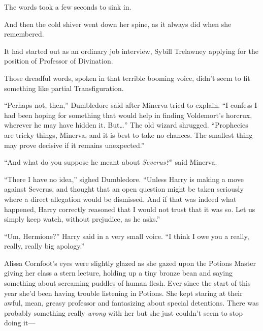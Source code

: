 The words took a few seconds to sink in.

And then the cold shiver went down her spine, as it always did when she remembered.

It had started out as an ordinary job interview, Sybill Trelawney applying for the position of Professor of Divination.


Those dreadful words, spoken in that terrible booming voice, didn’t seem to fit something like partial Transfiguration.

“Perhaps not, then,” Dumbledore said after Minerva tried to explain. “I confess I had been hoping for something that would help in finding Voldemort’s horcrux, wherever he may have hidden it. But…” The old wizard shrugged. “Prophecies are tricky things, Minerva, and it is best to take no chances. The smallest thing may prove decisive if it remains unexpected.”

“And what do you suppose he meant about \emph{Severus?}” said Minerva.

“There I have no idea,” sighed Dumbledore. “Unless Harry is making a move against Severus, and thought that an open question might be taken seriously where a direct allegation would be dismissed. And if that was indeed what happened, Harry correctly reasoned that I would not trust that it was so. Let us simply keep watch, without prejudice, as he asks.”


“Um, Hermione?” Harry said in a very small voice. “I think I owe you a really, really, really big apology.”


Alissa Cornfoot’s eyes were slightly glazed as she gazed upon the Potions Master giving her class a stern lecture, holding up a tiny bronze bean and saying something about screaming puddles of human flesh. Ever since the start of this year she’d been having trouble listening in Potions. She kept staring at their awful, mean, greasy professor and fantasizing about special detentions. There was probably something really \emph{wrong} with her but she just couldn’t seem to stop doing it—

